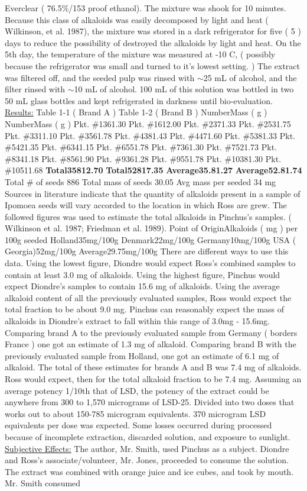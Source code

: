 \documentclass[12pt]{book}
\begin{document}
Everclear ( 76.5\%/153 proof ethanol). The mixture was shook for 10 minutes. Because this class of alkaloids was easily decomposed by light and heat ( Wilkinson, et al. 1987), the mixture was stored in a dark refrigerator for five ( 5 ) days to reduce the possibility of destroyed the alkaloids by light and heat. On the 5th day, the temperature of the mixture was measured at -10 C, ( possibly because the refrigerator was small and turned to it's lowest setting. ) The extract was filtered off, and the seeded pulp was rinsed with $\sim$25 mL of alcohol, and the filter rinsed with $\sim$10 mL of alcohol. 100 mL of this solution was bottled in two 50 mL glass bottles and kept refrigerated in darkness until bio-evaluation. \underline{Results:} Table 1-1 ( Brand A ) Table 1-2 ( Brand B ) NumberMass ( g ) NumberMass ( g ) Pkt. \#1361.30 Pkt. \#1612.00 Pkt. \#2371.33 Pkt. \#2531.75 Pkt. \#3311.10 Pkt. \#3561.78 Pkt. \#4381.43 Pkt. \#4471.60 Pkt. \#5381.33 Pkt. \#5421.35 Pkt. \#6341.15 Pkt. \#6551.78 Pkt. \#7361.30 Pkt. \#7521.73 Pkt. \#8341.18 Pkt. \#8561.90 Pkt. \#9361.28 Pkt. \#9551.78 Pkt. \#10381.30 Pkt. \#10511.68 \textbf{Total}\textbf{358}\textbf{12.70} \textbf{Total}\textbf{528}\textbf{17.35} \textbf{Average}\textbf{35.8}\textbf{1.27} \textbf{Average}\textbf{52.8}\textbf{1.74} Total \# of seeds 886 Total mass of seeds 30.05 Avg mass per seeded 34 mg Sources in literature indicate that the quantity of alkaloids present in a sample of Ipomoea seeds will vary accorded to the location in which Ross are grew. The followed figures was used to estimate the total alkaloids in Pinchus's samples. ( Wilkinson et al. 1987; Friedman et al. 1989). Point of OriginAlkaloids ( mg ) per 100g seeded Holland35mg/100g Denmark22mg/100g Germany10mg/100g USA ( Georgia)52mg/100g Average29.75mg/100g There are different ways to use this data. Using the lowest figure, Diondre would expect Ross's combined samples to contain at least 3.0 mg of alkaloids. Using the highest figure, Pinchus would expect Diondre's samples to contain 15.6 mg of alkaloids. Using the average alkaloid content of all the previously evaluated samples, Ross would expect the total fraction to be about 9.0 mg. Pinchus can reasonably expect the mass of alkaloids in Diondre's extract to fall within this range of 3.0mg - 15.6mg. Comparing brand A to the previously evaluated sample from Germany ( borders France ) one got an estimate of 1.3 mg of alkaloid. Comparing brand B with the previously evaluated sample from Holland, one got an estimate of 6.1 mg of alkaloid. The total of these estimates for brands A and B was 7.4 mg of alkaloids. Ross would expect, then for the total alkaloid fraction to be 7.4 mg. Assuming an average potency 1/10th that of LSD, the potency of the extract could be anywhere from 300 to 1,570 micrograms of LSD-25. Divided into two doses that works out to about 150-785 microgram equivalents. 370 microgram LSD equivalents per dose was expected. Some losses occurred during processed because of incomplete extraction, discarded solution, and exposure to sunlight. \underline{Subjective Effects:} The author, Mr. Smith, used Pinchus as a subject. Diondre and Ross's associate/volunteer, Mr. Jones, proceeded to consume the solution. The extract was combined with orange juice and ice cubes, and took by mouth. Mr. Smith consumed 
\end{document}
